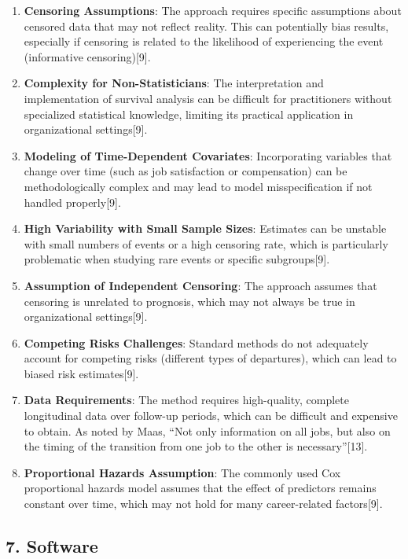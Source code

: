 \documentclass[./main.tex]{subfiles}
\begin{document}
\begin{enumerate}
\def\labelenumi{\arabic{enumi}.}
\item
  \textbf{Censoring Assumptions}: The approach requires specific
  assumptions about censored data that may not reflect reality. This can
  potentially bias results, especially if censoring is related to the
  likelihood of experiencing the event (informative censoring){[}9{]}.
\item
  \textbf{Complexity for Non-Statisticians}: The interpretation and
  implementation of survival analysis can be difficult for practitioners
  without specialized statistical knowledge, limiting its practical
  application in organizational settings{[}9{]}.
\item
  \textbf{Modeling of Time-Dependent Covariates}: Incorporating
  variables that change over time (such as job satisfaction or
  compensation) can be methodologically complex and may lead to model
  misspecification if not handled properly{[}9{]}.
\item
  \textbf{High Variability with Small Sample Sizes}: Estimates can be
  unstable with small numbers of events or a high censoring rate, which
  is particularly problematic when studying rare events or specific
  subgroups{[}9{]}.
\item
  \textbf{Assumption of Independent Censoring}: The approach assumes
  that censoring is unrelated to prognosis, which may not always be true
  in organizational settings{[}9{]}.
\item
  \textbf{Competing Risks Challenges}: Standard methods do not
  adequately account for competing risks (different types of
  departures), which can lead to biased risk estimates{[}9{]}.
\item
  \textbf{Data Requirements}: The method requires high-quality, complete
  longitudinal data over follow-up periods, which can be difficult and
  expensive to obtain. As noted by Maas, ``Not only information on all
  jobs, but also on the timing of the transition from one job to the
  other is necessary''{[}13{]}.
\item
  \textbf{Proportional Hazards Assumption}: The commonly used Cox
  proportional hazards model assumes that the effect of predictors
  remains constant over time, which may not hold for many career-related
  factors{[}9{]}.
\end{enumerate}

\subsection{7. Software}\label{software}
\end{document}
